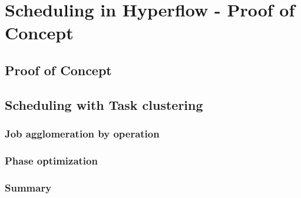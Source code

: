 \thispagestyle{only-cfoot}
\section{Scheduling in Hyperflow - Proof of Concept}\label{s:SchedHyperflow}




\subsection{Proof of Concept}\label{s:SchedHyperflow:PoC}






\subsection{Scheduling with Task clustering}\label{s:SchedHyperflow:Agglomeration}




\subsubsection{Job agglomeration by operation}




\subsubsection{Phase optimization}




\subsubsection{Summary}

